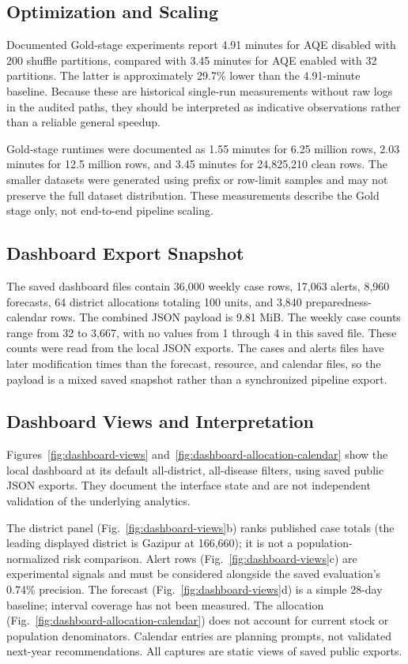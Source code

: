 \documentclass[conference]{IEEEtran}
\begin{document}
\subsection{Optimization and Scaling}

Documented Gold-stage experiments report 4.91 minutes for AQE disabled with 200 shuffle partitions, compared with 3.45 minutes for AQE enabled with 32 partitions. The latter is approximately 29.7\% lower than the 4.91-minute baseline. Because these are historical single-run measurements without raw logs in the audited paths, they should be interpreted as indicative observations rather than a reliable general speedup.

Gold-stage runtimes were documented as 1.55 minutes for 6.25 million rows, 2.03 minutes for 12.5 million rows, and 3.45 minutes for 24,825,210 clean rows. The smaller datasets were generated using prefix or row-limit samples and may not preserve the full dataset distribution. These measurements describe the Gold stage only, not end-to-end pipeline scaling.

\subsection{Dashboard Export Snapshot}

The saved dashboard files contain 36,000 weekly case rows, 17,063 alerts, 8,960 forecasts, 64 district allocations totaling 100 units, and 3,840 preparedness-calendar rows. The combined JSON payload is 9.81 MiB. The weekly case counts range from 32 to 3,667, with no values from 1 through 4 in this saved file. These counts were read from the local JSON exports. The cases and alerts files have later modification times than the forecast, resource, and calendar files, so the payload is a mixed saved snapshot rather than a synchronized pipeline export.

\subsection{Dashboard Views and Interpretation}
Figures~\ref{fig:dashboard-views} and~\ref{fig:dashboard-allocation-calendar} show the local dashboard at its default all-district, all-disease filters, using saved public JSON exports. They document the interface state and are not independent validation of the underlying analytics.

The district panel (Fig.~\ref{fig:dashboard-views}b) ranks published case totals (the leading displayed district is Gazipur at 166,660); it is not a population-normalized risk comparison. Alert rows (Fig.~\ref{fig:dashboard-views}c) are experimental signals and must be considered alongside the saved evaluation's 0.74\% precision. The forecast (Fig.~\ref{fig:dashboard-views}d) is a simple 28-day baseline; interval coverage has not been measured. The allocation (Fig.~\ref{fig:dashboard-allocation-calendar}) does not account for current stock or population denominators. Calendar entries are planning prompts, not validated next-year recommendations. All captures are static views of saved public exports.
\end{document}
